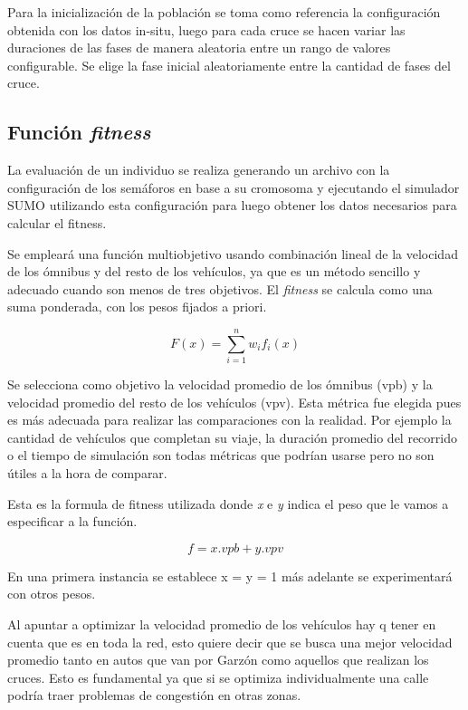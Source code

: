 Para la inicialización de la población se toma como referencia
la configuración obtenida con los datos in-situ, luego para cada
cruce se hacen variar las duraciones de las fases de manera aleatoria entre un rango de valores configurable. Se elige la fase inicial aleatoriamente entre la cantidad de fases del cruce.

\subsection{Función \emph{fitness}}


La evaluación de un individuo se realiza generando un archivo con la configuración de los semáforos en base a su cromosoma y ejecutando el simulador SUMO utilizando esta configuración para luego obtener los datos necesarios para calcular el fitness.

Se empleará una función multiobjetivo usando combinación lineal de la velocidad de los ómnibus y del resto de los vehículos, ya que es un método sencillo y adecuado cuando son menos de tres objetivos. El \emph{fitness} se calcula como una suma ponderada, con los pesos fijados a priori.

        \begin{equation}
        \label{eq:funcion_fitness_generica}
		F(x) = \sum_{i=1}^{n}{w_i}{f_i}(x)
        \end{equation}

Se selecciona como objetivo la velocidad promedio de los ómnibus (vpb) y la velocidad promedio del resto de los vehículos (vpv). Esta métrica fue elegida pues es más adecuada para realizar las comparaciones con la realidad. Por ejemplo la cantidad de vehículos que completan su viaje, la duración promedio del recorrido o el tiempo de simulación son todas métricas que podrían usarse pero no son útiles a la hora de comparar.

Esta es la formula de fitness utilizada donde \emph{x} e \emph{y} indica el peso que le vamos a especificar a la función. 

        \begin{equation}
        \label{eq:funcion_fitness}
        f = x.vpb + y.vpv
        \end{equation}
        
En una primera instancia se establece x = y = 1 más adelante se experimentará con otros pesos.

Al apuntar a optimizar la velocidad promedio de los vehículos hay q tener en cuenta que es en toda la red, esto quiere decir que se busca una mejor velocidad promedio tanto en autos que van por Garzón como aquellos que realizan los cruces. Esto es fundamental ya que si se optimiza individualmente una calle podría traer problemas de congestión en otras zonas.

